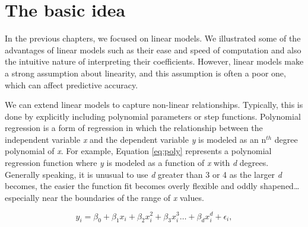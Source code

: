 \documentclass[]{book}
\newenvironment{Shaded}{\begin{snugshade}}{\end{snugshade}}
\newcommand{\CommentTok}[1]{\textcolor[rgb]{0.56,0.35,0.01}{\textit{#1}}}
\newcommand{\DataTypeTok}[1]{\textcolor[rgb]{0.13,0.29,0.53}{#1}}
\newcommand{\DecValTok}[1]{\textcolor[rgb]{0.00,0.00,0.81}{#1}}
\newcommand{\FloatTok}[1]{\textcolor[rgb]{0.00,0.00,0.81}{#1}}
\newcommand{\KeywordTok}[1]{\textcolor[rgb]{0.13,0.29,0.53}{\textbf{#1}}}
\newcommand{\NormalTok}[1]{#1}
\newcommand{\OperatorTok}[1]{\textcolor[rgb]{0.81,0.36,0.00}{\textbf{#1}}}
\newcommand{\StringTok}[1]{\textcolor[rgb]{0.31,0.60,0.02}{#1}}
\theoremstyle{definition}
\theoremstyle{definition}
\theoremstyle{definition}
\theoremstyle{remark}
\begin{document}
\begin{Shaded}
\end{Shaded}

\hypertarget{the-basic-idea}{%
\section{The basic idea}\label{the-basic-idea}}

In the previous chapters, we focused on linear models. We illustrated
some of the advantages of linear models such as their ease and speed of
computation and also the intuitive nature of interpreting their
coefficients. However, linear models make a strong assumption about
linearity, and this assumption is often a poor one, which can affect
predictive accuracy.

We can extend linear models to capture non-linear relationships.
Typically, this is done by explicitly including polynomial parameters or
step functions. Polynomial regression is a form of regression in which
the relationship between the independent variable \emph{x} and the
dependent variable \emph{y} is modeled as an n\(^{th}\) degree
polynomial of \emph{x}. For example, Equation \eqref{eq:poly} represents a
polynomial regression function where \emph{y} is modeled as a function
of \emph{x} with \emph{d} degrees. Generally speaking, it is unusual to
use \emph{d} greater than 3 or 4 as the larger \emph{d} becomes, the
easier the function fit becomes overly flexible and oddly
shapened\ldots{}especially near the boundaries of the range of \emph{x}
values.

\begin{equation}
\label{eq:poly}
  y_i = \beta_0 + \beta_1 x_i + \beta_2 x^2_i + \beta_3 x^3_i \dots + \beta_d x^d_i + \epsilon_i,
\end{equation}
\end{document}

